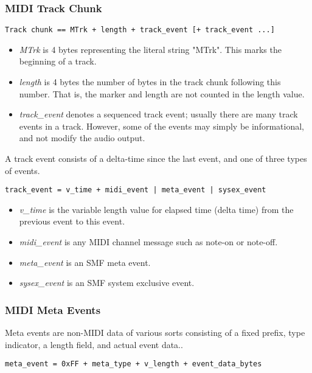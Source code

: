 \subsubsection{MIDI Track Chunk}
\label{subsubsec:midi_track_chunk}

   \texttt{Track chunk == MTrk + length + track\_event [+ track\_event ...]}

   \begin{itemize}
      \item \textsl{MTrk} is 4 bytes representing the literal string "MTrk".
         This marks the beginning of a track.
      \item \textsl{length} is 4 bytes the number of bytes in the track
         chunk following this number.  That is, the marker and length are
         not counted in the length value.
      \item \textsl{track\_event} denotes a sequenced track event; usually
         there are many track events in a  track.  However, some of the
         events may simply be informational, and not modify the audio
         output.
   \end{itemize}

   A track event consists of a delta-time since the last event, and one of
   three types of events.
 
   \texttt{track\_event = v\_time + midi\_event | meta\_event | sysex\_event}
 
   \begin{itemize}
      \item \textsl{v\_time} is the variable length value for elapsed time
         (delta time) from the previous event to this event.
      \item \textsl{midi\_event} is any MIDI channel message such as note-on
         or note-off.
      \item \textsl{meta\_event} is an SMF meta event.
      \item \textsl{sysex\_event} is an SMF system exclusive event.
   \end{itemize}

\subsubsection{MIDI Meta Events}
\label{subsubsec:midi_meta_events}

   Meta events are non-MIDI data of various sorts consisting of a fixed prefix,
   type indicator, a length field, and actual event data..
 
   \texttt{meta\_event = 0xFF + meta\_type + v\_length + event\_data\_bytes}

